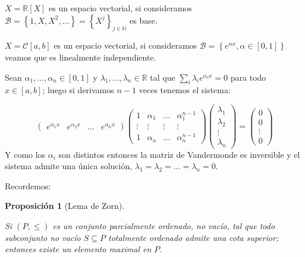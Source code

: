 \documentclass[11pt]{article}
\newcommand{\B}{\mathcal{B}}
\newcommand{\R}{{\mathbb{R}}}
\newcommand{\N}{{\mathbb{N}}}
\newcommand{\sett}[1]{\left\lbrace#1\right\rbrace}
\newcommand{\Bigsum}[2]{\sum\limits_{#1}{#2}}
\newtheorem{proposition}[theorem]{Proposici\'on}
\newenvironment{proof}[1][Demostraci\'on]{\begin{trivlist}
		\item[\hskip \labelsep {\bfseries #1}]}{\end{trivlist}}
\newenvironment{example}[1][Ejemplo]{\begin{trivlist}
		\item[\hskip \labelsep {\bfseries #1 }]}{\end{trivlist}}
\newcommand{\qed}{\nobreak \ifvmode \relax \else
	\ifdim\lastskip<1.5em \hskip-\lastskip
	\hskip1.5em plus0em minus0.5em \fi \nobreak
	\vrule height0.75em width0.5em depth0.25em\fi}
\begin{document}
\begin{example}



\begin{itemize}
	\item $X=\R[X]$ es un espacio vectorial, si consideramos $\B = \sett{1,X,X^2, \dots} = \sett{X^j}_{j \in \N}$ es base.
	\item $X=\mathcal{C}[a,b]$ es un espacio vectorial, si consideramos $\B = \sett{e^{\alpha x}, \alpha \in [0,1]}$ veamos que es linealmente independiente.
	
	\begin{proof}
		Sean $\alpha_1, \dots, \alpha_n \in [0,1]$ y $\lambda_{1}, \dots, \lambda_{n} \in \R$ tal que $\Bigsum{i}{\lambda_i e^{\alpha_i x}} = 0$ para todo $x \in [a,b]$; luego si derivamos $n-1$ veces tenemos el sistema:
		
		\[
			\left(
				\begin{array}{cccc}
					e^{\alpha_1 x} &  e^{\alpha_2 x} &  \dots &  e^{\alpha_n x} 
				\end{array}
			\right)
			\left(
				\begin{array}{cccc}
					1 & \alpha_1 &  \dots &  \alpha_1^{n-1} \\
					\vdots & \vdots & \vdots & \vdots \\
					1 &  \alpha_n &  \dots &  \alpha_n^{n-1}					 
				\end{array}
			\right)
			\left(
			\begin{array}{c}
			\lambda_{1} \\
			\lambda_{2} \\
			\vdots \\
			\lambda_{n}
			\end{array}
			\right) = 
			\left(
			\begin{array}{c}
			0 \\
			0 \\
			\vdots \\
			0
			\end{array}
			\right)
		\]
		Y como los $\alpha_i$ son distintos entonces la matriz de Vandermonde es inversible y el sistema admite una \'unica soluci\'on, $\lambda_{1} = \lambda_{2} = \dots = \lambda_{n} = 0$. \qed
	\end{proof}

\end{itemize}
\end{example}

Recordemos:

\begin{proposition}[Lema de Zorn]
	\label{Lema de Zorn}
	
	Si $(P,\leq)$ es un conjunto parcialmente ordenado, no vac\'io, tal que todo subconjunto no vac\'io $S \subseteq P$ totalmente ordenado admite una cota superior; entonces existe un elemento maximal en $P$.
\end{proposition}
\end{document}
